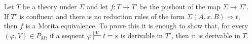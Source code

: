 \documentclass[reqno]{amsart}
\theoremstyle{definition}
\theoremstyle{remark}
\newcommand{\app}{\mathit{app}}
\newcommand{\ty}{\mathit{ty}}
\numberwithin{figure}{section}
\begin{document}
\begin{example}
Let $T$ be a theory under $\Sigma$ and let $f : T \to T'$ be the pushout of the map $\Sigma \to \Sigma'$.
If $T'$ is confluent and there is no reduction rules of the form $\Sigma(A, x.\,B) \Rightarrow t$, then $f$ is a Morita equivalence.
To prove this it is enough to show that, for every $(\varphi,V) \in P_M$, if a sequent $\varphi \sststile{}{V} t = s$ is derivable in $T'$, then it is derivable in $T$.
\end{example}

% 
% 
\end{document}
